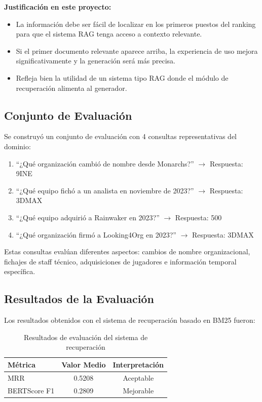 \textbf{Justificación en este proyecto:}
\begin{itemize}
    \item La información debe ser fácil de localizar en los primeros puestos del ranking para que el sistema RAG tenga acceso a contexto relevante.
    \item Si el primer documento relevante aparece arriba, la experiencia de uso mejora significativamente y la generación será más precisa.
    \item Refleja bien la utilidad de un sistema tipo RAG donde el módulo de recuperación alimenta al generador.
\end{itemize}

\subsection{Conjunto de Evaluación}

Se construyó un conjunto de evaluación con 4 consultas representativas del dominio:

\begin{enumerate}
    \item ``¿Qué organización cambió de nombre desde Monarchs?'' $\rightarrow$ Respuesta: 9INE
    \item ``¿Qué equipo fichó a un analista en noviembre de 2023?'' $\rightarrow$ Respuesta: 3DMAX
    \item ``¿Qué equipo adquirió a Rainwaker en 2023?'' $\rightarrow$ Respuesta: 500
    \item ``¿Qué organización firmó a Looking4Org en 2023?'' $\rightarrow$ Respuesta: 3DMAX
\end{enumerate}

Estas consultas evalúan diferentes aspectos: cambios de nombre organizacional, fichajes de staff técnico, adquisiciones de jugadores e información temporal específica.

\subsection{Resultados de la Evaluación}

Los resultados obtenidos con el sistema de recuperación basado en BM25 fueron:

\begin{table}[ht]
\centering
\caption{Resultados de evaluación del sistema de recuperación}%
\label{tab:eval_results}
\begin{tabular}{lcc}
\hline
\textbf{Métrica} & \textbf{Valor Medio} & \textbf{Interpretación} \\
\hline
MRR & 0.5208 & Aceptable \\
BERTScore F1 & 0.2809 & Mejorable \\
\hline
\end{tabular}
\end{table}

